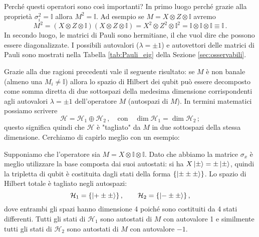 \noindent Perché questi operatori sono così importanti? In primo luogo perché grazie alla proprietà $\sigma_i^2 = \mathbb{I}$ allora $M^2 = \mathbb{I}$. Ad esempio se $M = X \otimes Z \otimes \mathbb{I}$ avremo
\begin{equation*}
    M^2 = (X \otimes Z \otimes \mathbb{I}) (X \otimes Z \otimes \mathbb{I}) = X^2 \otimes Z^2 \otimes \mathbb{I}^2 = \mathbb{I} \otimes \mathbb{I} \otimes \mathbb{I} \equiv \mathbb{I} \, .
\end{equation*}
In secondo luogo, le matrici di Pauli sono hermitiane, il che vuol dire che possono essere diagonalizzate. I possibili autovalori ($\lambda = \pm 1$) e autovettori delle matrici di Pauli sono mostrati nella Tabella \ref{tab:Pauli_eig} della Sezione \ref{sec:osservabili}. 

\noindent Grazie alla due ragioni precedenti vale il seguente risultato: se $M$ è non banale (almeno una $M_i \neq \mathbb{I}$) allora lo spazio di Hilbert dei qubit può essere decomposto come somma diretta di due sottospazi della medesima dimensione corrispondenti agli autovalori $\lambda = \pm 1$ dell'operatore $M$ (autospazi di $M$). In termini matematici possiamo scrivere 
\begin{equation}\label{decomposition_direct_sum}
    \mathcal{H} = \mathcal{H}_1 \oplus \mathcal{H}_2 \, , \quad \text{con} \quad \dim \mathcal{H}_1 = \dim \mathcal{H}_2 \, ;
\end{equation}
questo significa quindi che $\mathcal{H}$ è "tagliato" da $M$ in due sottospazi della stessa dimensione. Cerchiamo di capirlo meglio con un esempio:

\begin{esempio}\label{es:M}
    Supponiamo che l'operatore sia $M = X \otimes \mathbb{I} \otimes \mathbb{I}$. Dato che abbiamo la matrice $\sigma_x$ è meglio utilizzare la base composta dai suoi autostati: si ha $X \ket{\pm} = \pm \ket{\pm}$, quindi la tripletta di qubit è costituita dagli stati della forma $\{ \ket{\pm \pm \pm} \}$. Lo spazio di Hilbert totale è tagliato negli autospazi:
    \begin{equation}\label{H_1_H_2}
        \mathcal{H}_1 = \{ \ket{+ \pm \pm} \} \, , \qquad \mathcal{H}_2 = \{ \ket{- \pm \pm} \} \, ,
    \end{equation}
    dove entrambi gli spazi hanno dimensione 4 poiché sono costituiti da 4 stati differenti. Tutti gli stati di $\mathcal{H}_1$ sono autostati di $M$ con autovalore 1 e similmente tutti gli stati di $\mathcal{H}_2$ sono autostati di $M$ con autovalore $-1$.  
\end{esempio}

